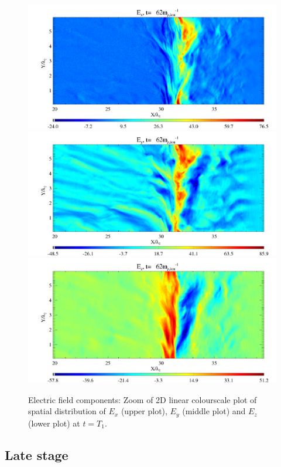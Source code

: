 \documentclass[structabstract]{aa}
\begin{document}
       \begin{figure}[t]
   \centering
  \includegraphics[width=\columnwidth]{15294f8a.png}
  \includegraphics[width=\columnwidth]{15294f8b.png}
  \includegraphics[width=\columnwidth]{15294f8c.png}
      \caption{Electric field components: Zoom of 2D linear colourscale plot 
of spatial distribution of $E_x$ (upper plot), $E_y$ (middle plot) and $E_z$ 
(lower plot) at $t=T_1$.}
         \label{FigZoomE}
   \end{figure}


\subsection{Late stage}
\label{Latestage}
\end{document}
